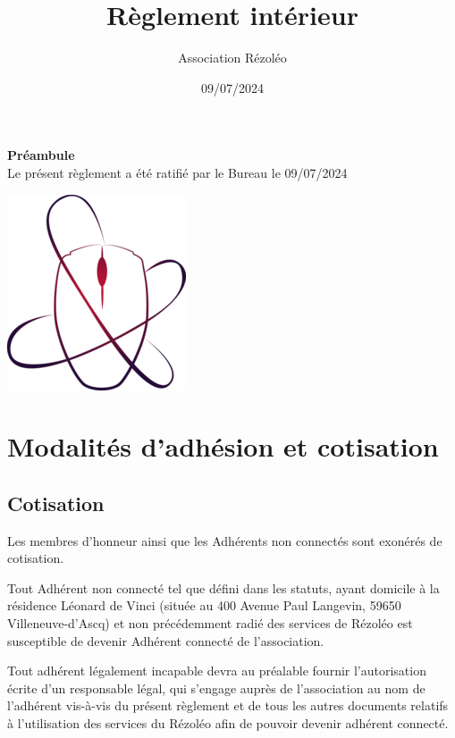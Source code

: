 \documentclass[12pt, a4paper]{article}
\begin{document}
	\title{Règlement intérieur}
	\author{Association Rézoléo}
	\date{09/07/2024}
	\maketitle

    \begin{center}
	   \textbf{Préambule}\\
          Le présent règlement a été ratifié par le Bureau le 09/07/2024

        \vspace{3cm}
        \includegraphics[scale=2]{rezoleo_logo.png}
          
    \end{center}

	\newpage

	\tableofcontents

	\newpage

	\section{Modalités d'adhésion et cotisation}

	\subsection{Cotisation}

	Les membres d'honneur ainsi que les Adhérents non connectés sont exonérés de cotisation.

	\bigskip

	Tout Adhérent non connecté tel que défini dans les statuts, ayant domicile à la
	résidence Léonard de Vinci (située au 400 Avenue Paul Langevin, 59650
	Villeneuve-d'Ascq) et non précédemment radié des services de Rézoléo est
	susceptible de devenir Adhérent connecté de l'association.

	\bigskip

	Tout adhérent légalement incapable devra au préalable fournir l'autorisation écrite
	d'un responsable légal, qui s'engage auprès de l'association au nom de l'adhérent
	vis-à-vis du présent règlement et de tous les autres documents relatifs à l'utilisation
	des services du Rézoléo afin de pouvoir devenir adhérent connecté.
\end{document}
